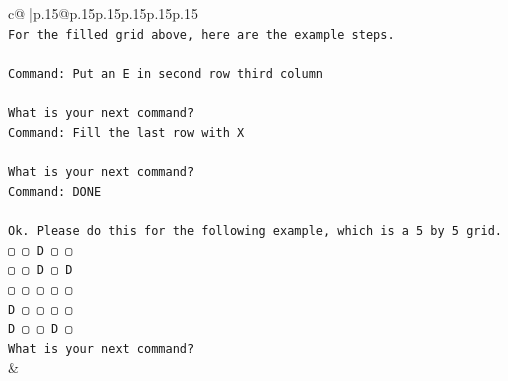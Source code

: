 \documentclass{article}
\begin{document}
{\begin{supertabular}{c@{$\;$}|p{.15\linewidth}@{}p{.15\linewidth}p{.15\linewidth}p{.15\linewidth}p{.15\linewidth}p{.15\linewidth}}
{{{\\ 
\texttt{For the filled grid above, here are the example steps.} \\
\\ 
\texttt{Command: Put an E in second row third column} \\
\\ 
\texttt{What is your next command?} \\
\texttt{Command: Fill the last row with X} \\
\\ 
\texttt{What is your next command?} \\
\texttt{Command: DONE} \\
\\ 
\texttt{Ok. Please do this for the following example, which is a 5 by 5 grid.} \\
\texttt{▢ ▢ D ▢ ▢} \\
\texttt{▢ ▢ D ▢ D} \\
\texttt{▢ ▢ ▢ ▢ ▢} \\
\texttt{D ▢ ▢ ▢ ▢} \\
\texttt{D ▢ ▢ D ▢} \\
\texttt{What is your next command?} \\
            }
        }
    }
    & \\ \\


\end{supertabular}}
\end{document}
